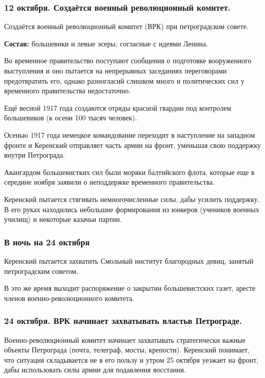 \subsubsection{\textbf{12 октября. Создаётся военный революционный комитет.}}

Создаётся военный революционный комитет (ВРК) при петроградском совете.

\textbf{Состав:} большевики и левые эсеры, согласные с идеями Ленина.

Во временное правительство поступают сообщения о подготовке вооруженного выступления и оно пытается на непрерывных заседаниях переговорами предотвратить его, однако разногласий слишком много и политических сил у временного правительства недостаточно. 

Ещё весной 1917 года создаются отряды красной гвардии под контролем большевиков (к осени 100 тысяч человек).

Осенью 1917 года немецкое командование переходит в наступление на западном фронте и Керенский отправляет часть армии на фронт, уменьшая свою поддержку внутри Петрограда. 

Авангардом большевистких сил были моряки балтийского флота, которые еще в середине ноября заявили о неподдержке временного правительства.

Керенский пытается стягивать немногочисленные силы, дабы усилить поддержку. В его руках находились небольшие формирования из юнкеров (учеников военных училищ) и некоторые казачьи партии.

\subsubsection{\textbf{В ночь на 24 октября}}

Керенский пытается захватить Смольный институт благородных девиц, занятый петроградским советом.

В это же время выходит распоряжение о закрытии большевистских газет, аресте членов военно-революционного комитета.

\subsubsection{\textbf{24 октября. ВРК начинает захватывать властьв Петрограде.}}

Военно-революционный комитет начинает захватывать стратегически важные объекты Петрограда (почта, телеграф, мосты, крепости). Керенский понимает, что ситуация складывается не в его пользу и утром 25 октября уезжает на фронт, дабы использовать силы армии для подавления восстания.

